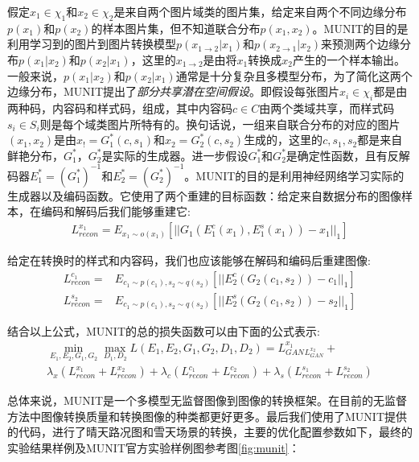 假定$x_1\in \chi_1$和$x_2\in \chi_2$是来自两个图片域类的图片集，给定来自两个不同边缘分布$p(x_1)$和$p(x_2)$的样本图片集，但不知道联合分布$p(x_1, x_2)$。MUNIT的目的是利用学习到的图片到图片转换模型$p(x_{1\to 2}|x_1)$和$p(x_{2\to 1}|x_2)$来预测两个边缘分布$p(x_1|x_2)$和$p(x_2|x_1)$，这里的$x_{1\to 2}$是由将$x_1$转换成$x_2$产生的一个样本输出。一般来说，$p(x_1|x_2)$和$p(x_2|x_1)$通常是十分复杂且多模型分布，为了简化这两个边缘分布，MUNIT提出了\textit{部分共享潜在空间假设}。即假设每张图片$x_i\in \chi_i$都是由两种码，内容码和样式码，组成，其中内容码$c\in C$由两个类域共享，而样式码$s_i\in S_i$则是每个域类图片所特有的。换句话说，一组来自联合分布的对应的图片$(x_1, x_2)$是由$x_!=G_1^*(c,s_1)$和$x_2=G_2^*(c, s_2)$生成的，这里的$c,s_1,s_2$都是来自鲜艳分布，$G_1^*，G_2^*$是实际的生成器。进一步假设$G_1^*$和$G_2^*$是确定性函数，且有反解码器$E_1^*=(G_1^*)^{-1}$和$E_2^*=(G_2^*)^{-1}$。MUNIT的目的是利用神经网络学习实际的生成器以及编码函数。它使用了两个重建的目标函数：给定来自数据分布的图像样本，在编码和解码后我们能够重建它:
\begin{gather}
    L_{recon}^{x_1}=E_{x_1\sim o(x_1)}[||G_1(E_1^c(x_1), E_1^s(x_1))-x_1||_1] 
\end{gather}

给定在转换时的样式和内容码，我们也应该能够在解码和编码后重建图像:
\begin{equation}
    \begin{aligned}
        L_{recon}^{c_1}= & E_{c_1\sim p(c_1), s_2\sim q(s_2)}[||E_2^c(G_2(c_1,s_2))-c_1||_1] \\
    L_{recon}^{s_2}= & E_{c_1\sim p(c_1), s_2\sim q(s_2)}[||E_2^s(G_2(c_1, s_2))-s_2||_1]
    \end{aligned}
\end{equation}

结合以上公式，MUNIT的总的损失函数可以由下面的公式表示:
\begin{equation}
\begin{aligned}
    \min_{E_1,E_2,G_1,G_2}\max_{D_1,D_2}L(E_1,E_2,G_1,G_2,D_1,D_2)=L_{GAN}^{x_1}_L_{GAN}^{x_2}+\\
\lambda_x(L_{recon}^{x_1}+L_{recon}^{x_2})+\lambda_c(L_{recon}^{c_1}+L_{recon}^{c_2})+\lambda_s(L_{recon}^{s_1}+L_{recon}^{s_2})
\end{aligned}
\end{equation}

总体来说，MUNIT是一个多模型无监督图像到图像的转换框架。在目前的无监督方法中图像转换质量和转换图像的种类都更好更多。最后我们使用了MUNIT提供的代码，进行了晴天路况图和雪天场景的转换，主要的优化配置参数如下，最终的实验结果样例及MUNIT官方实验样例图参考图\ref{fig:munit}：

